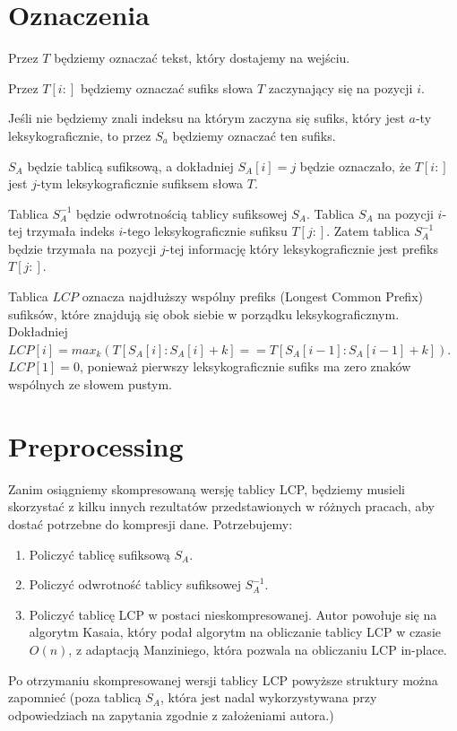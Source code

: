 \documentclass{article}
\begin{document}
\section{Oznaczenia}

Przez $T$ będziemy oznaczać tekst, który dostajemy na wejściu.

Przez $T[i:]$ będziemy oznaczać sufiks słowa $T$ zaczynający się na pozycji $i$.

Jeśli nie będziemy znali indeksu na którym zaczyna się sufiks, który jest $a$-ty leksykograficznie, to przez $S_a$ będziemy oznaczać ten sufiks.

$S_A$ będzie tablicą sufiksową, a dokładniej $S_A[i] = j$ będzie oznaczało, że $T[i:]$ jest $j$-tym leksykograficznie sufiksem słowa $T$.

Tablica $S_A^{-1}$ będzie odwrotnością tablicy sufiksowej $S_A$. Tablica $S_A$ na pozycji $i$-tej trzymała indeks $i$-tego leksykograficznie sufiksu $T[j:]$. Zatem tablica $S_A^{-1}$ będzie trzymała na pozycji $j$-tej informację który leksykograficznie jest prefiks $T[j:]$.

Tablica $LCP$ oznacza najdłuższy wspólny prefiks (Longest Common Prefix) sufiksów, które znajdują się obok siebie w porządku leksykograficznym. Dokładniej $LCP[i] = max_k(T[S_A[i]:S_A[i]+k] == T[S_A[i-1]:S_A[i-1]+k])$. $LCP[1] = 0$, ponieważ pierwszy leksykograficznie sufiks ma zero znaków wspólnych ze słowem pustym.

\section{Preprocessing}

Zanim osiągniemy skompresowaną wersję tablicy LCP, będziemy musieli skorzystać z kilku innych rezultatów przedstawionych w różnych pracach, aby dostać potrzebne do kompresji dane. Potrzebujemy:

\begin{enumerate}
    \item Policzyć tablicę sufiksową $S_A$.
    \item Policzyć odwrotność tablicy sufiksowej $S_A^{-1}$.
    \item Policzyć tablicę LCP w postaci nieskompresowanej. Autor powołuje się na algorytm Kasaia, który podał algorytm na obliczanie tablicy LCP w czasie $O(n)$, z adaptacją Manziniego, która pozwala na obliczaniu LCP in-place.
\end{enumerate}

Po otrzymaniu skompresowanej wersji tablicy LCP powyższe struktury można zapomnieć (poza tablicą $S_A$, która jest nadal wykorzystywana przy odpowiedziach na zapytania zgodnie z założeniami autora.)
\end{document}
